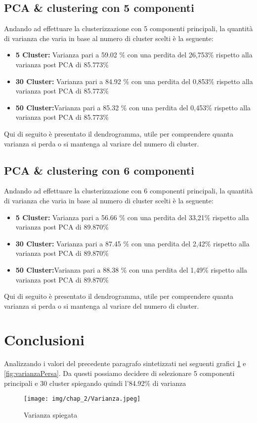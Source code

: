\subsection{PCA \& clustering con 5 componenti}
Andando ad effettuare la clusterizzazione con 5 componenti principali, la quantità di varianza che varia in base al numero di cluster scelti è la seguente:
\begin{itemize}
  \item \textbf{5 Cluster:} Varianza pari a 59.02 \% con una perdita del 26,753\% rispetto alla varianza post PCA di 85.773\%
  \item \textbf{30 Cluster:} Varianza pari a 84.92 \% con una perdita del 0,853\% rispetto alla varianza post PCA di 85.773\%
  \item \textbf{50 Cluster:}Varianza pari a 85.32 \% con una perdita del 0,453\% rispetto alla varianza post PCA di 85.773\%
\end{itemize}
Qui di seguito è presentato il dendrogramma, utile per comprendere quanta varianza si perda o si mantenga al variare del numero di cluster.

\subsection{PCA \& clustering con 6 componenti}
Andando ad effettuare la clusterizzazione con 6 componenti principali, la quantità di varianza che varia in base al numero di cluster scelti è la seguente:
\begin{itemize}
  \item \textbf{5 Cluster:} Varianza pari a 56.66 \% con una perdita del 33,21\% rispetto alla varianza post PCA di 89.870\%
  \item \textbf{30 Cluster:} Varianza pari a 87.45 \% con una perdita del 2,42\% rispetto alla varianza post PCA di 89.870\%
  
  \item \textbf{50 Cluster:}Varianza pari a 88.38 \% con una perdita del 1,49\% rispetto alla varianza post PCA di 89.870\%

\end{itemize}
Qui di seguito è presentato il dendrogramma, utile per comprendere quanta varianza si perda o si mantenga al variare del numero di cluster.

\section{Conclusioni}
Analizzando i valori del precedente paragrafo sintetizzati nei seguenti grafici \ref{fig:varianzaSpiegata} e \ref{fig:varianzaPersa}.
Da questi possiamo decidere di selezionare 5 componenti principali e 30 cluster spiegando quindi l'84.92\% di varianza
\begin{figure}[H]
    \centering
    \texttt{[image: img/chap\_2/Varianza.jpeg]}
    \caption{Varianza spiegata}
    \label{fig:varianzaSpiegata}
\end{figure}

